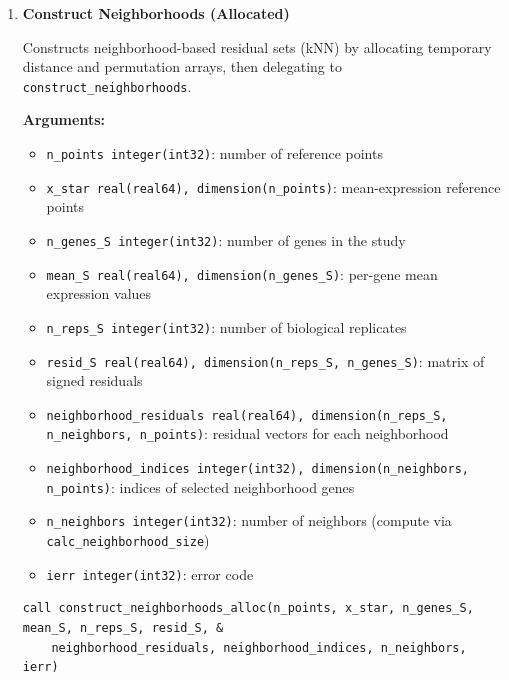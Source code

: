 \begin{enumerate}
        \begin{lstlisting}[caption={Calculate Neighborhood Size}]
n_neighbors = calc_neighborhood_size(n_pool, n_points, n_genes_S, mean_S, desired_size)
        \end{lstlisting}

    \item \textbf{Construct Neighborhoods (Allocated)}

        Constructs neighborhood-based residual sets (kNN) by allocating temporary distance and permutation arrays, then delegating to \lstinline!construct_neighborhoods!.

        \textbf{Arguments:}
        \begin{itemize}
            \item \lstinline!n_points integer(int32)!: number of reference points
            \item \lstinline!x_star real(real64), dimension(n_points)!: mean-expression reference points
            \item \lstinline!n_genes_S integer(int32)!: number of genes in the study
            \item \lstinline!mean_S real(real64), dimension(n_genes_S)!: per-gene mean expression values
            \item \lstinline!n_reps_S integer(int32)!: number of biological replicates
            \item \lstinline!resid_S real(real64), dimension(n_reps_S, n_genes_S)!: matrix of signed residuals
            \item \lstinline!neighborhood_residuals real(real64), dimension(n_reps_S, n_neighbors, n_points)!: residual vectors for each neighborhood
            \item \lstinline!neighborhood_indices integer(int32), dimension(n_neighbors, n_points)!: indices of selected neighborhood genes
            \item \lstinline!n_neighbors integer(int32)!: number of neighbors (compute via \lstinline!calc_neighborhood_size!)
            \item \lstinline!ierr integer(int32)!: error code
        \end{itemize}

        \begin{lstlisting}[caption={Construct Neighborhoods (Allocated)}]
call construct_neighborhoods_alloc(n_points, x_star, n_genes_S, mean_S, n_reps_S, resid_S, &
    neighborhood_residuals, neighborhood_indices, n_neighbors, ierr)
        \end{lstlisting}


\end{enumerate}
